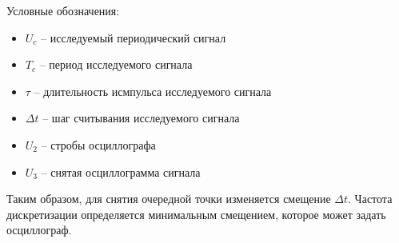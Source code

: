 Условные обозначения:

\begin{itemize}[label={}]
	\item $ U_{c} $ -- исследуемый периодический сигнал
	\item $ T_{c} $ -- период исследуемого сигнала
	\item $ \tau $ -- длительность исмпульса исследуемого сигнала
	\item $ \Delta t $ -- шаг считывания исследуемого сигнала
	\item $ U_{2} $ -- стробы осциллографа
	\item $ U_{3} $ -- снятая осциллограмма сигнала\\
\end{itemize}

Таким образом, для снятия очередной точки изменяется смещение $ \Delta t $.
Частота дискретизации определяется минимальным смещением, которое может задать осциллограф.
\FloatBarrier
\newpage